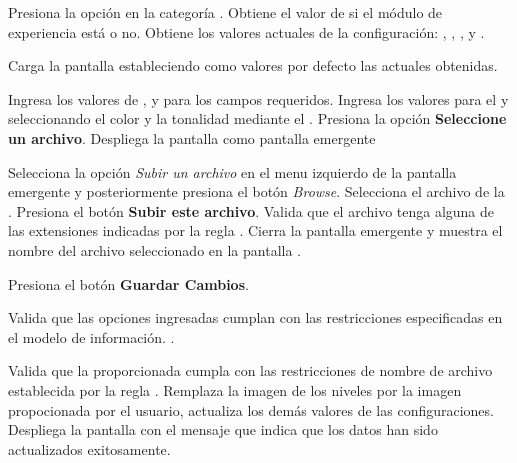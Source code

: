 \begin{UCtrayectoria}%
   

  \Actor Presiona la opción {\bf {}} en la categoría
         .
  \Sistema Obtiene el valor de si el módulo de experiencia está  o no. 
  \Sistema Obtiene los valores actuales de la configuración:
           ,
           ,
           ,
            y
           .

  \Sistema Carga la pantalla  estableciendo como valores por defecto
           las  actuales obtenidas.

  \Actor Ingresa los valores de ,
          y
          para los campos requeridos.
         \label{CU-E02-1.formulario}
  \Actor Ingresa los valores para el  y
          seleccionando el color y la
         tonalidad mediante el . 
         \label{CU-E02-1.color}
  \Actor Presiona la opción {\bf Seleccione un archivo}. 
  \Sistema Despliega la pantalla  como pantalla emergente
           \label{CU-E02-1.seleccion-archivo}

  \Actor Selecciona la opción {\it Subir un archivo} en el menu izquierdo de la
         pantalla emergente y posteriormente presiona el botón {\it Browse}.
  \Actor Selecciona el archivo de la .
  \Actor Presiona el botón {\bf Subir este archivo}.
  \Sistema Valida que el archivo tenga alguna de las extensiones indicadas
           por la regla . 
  \Sistema Cierra la pantalla emergente y muestra el nombre del archivo seleccionado
           en la pantalla .


  \Actor Presiona el botón {\bf Guardar Cambios}.  \label{CU-E02-1.validacion}

  \Sistema Valida que las opciones ingresadas cumplan con las restricciones
           especificadas en el modelo de información. .

  \Sistema Valida que la  proporcionada cumpla con
           las restricciones de nombre de archivo establecida por la regla
           . 
  \Sistema Remplaza la imagen de los niveles por la imagen propocionada por el usuario,
           actualiza los demás valores de las configuraciones. 
  \Sistema Despliega la pantalla  con el mensaje que indica que
           los datos han sido actualizados exitosamente.
\end{UCtrayectoria}

